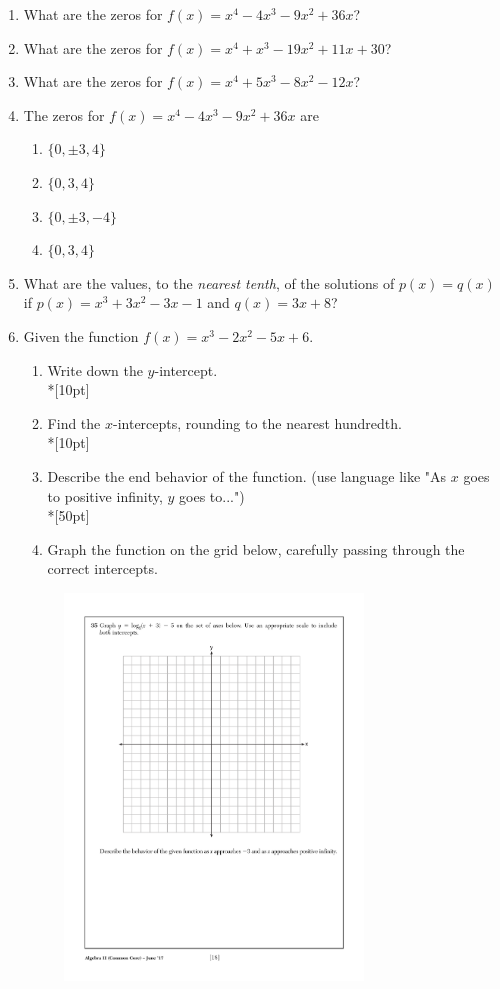 \documentclass[12pt, oneside]{article}
\begin{document}
\begin{enumerate}
\item What are the zeros for $f(x)=x^4-4x^3-9x^2+36x$? %
\item What are the zeros for $f(x)=x^4+x^3-19x^2+11x+30$?
\item What are the zeros for $f(x)=x^4+5x^3-8x^2-12x$?

\item The zeros for $f(x)=x^4-4x^3-9x^2+36x$ are
\begin{enumerate}
    \item $\{0, \pm 3, 4 \}$
    \item $\{0, 3, 4 \}$
    \item $\{0, \pm 3, -4 \}$
    \item $\{0, 3,4 \}$
\end{enumerate} %

\item What are the values, to the \emph{nearest tenth}, of the solutions of $p(x)=q(x)$ if $p(x)=x^3+3x^2-3x-1$ and $q(x)=3x+8$?

\item Given the function $f(x)=x^3-2x^2-5x+6$. 
\begin{enumerate}
    \item Write down the $y$-intercept.\\*[10pt]
    \item Find the $x$-intercepts, rounding to the nearest hundredth.\\*[10pt]
    \item Describe the end behavior of the function. (use language like "As $x$ goes to positive infinity, $y$ goes to...")\\*[50pt]
    \item Graph the function on the grid below, carefully passing through the correct intercepts. 
\end{enumerate}
\begin{figure}[!ht]
    \centering
    \includegraphics[width=0.75\textwidth]{regents-grid.pdf}
\end{figure}


\end{enumerate}
\end{document}

